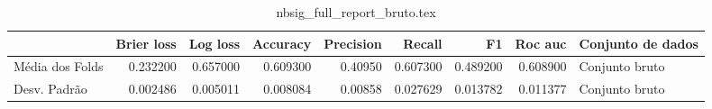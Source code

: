 \begin{table}
\centering
\caption{nbsig_full_report_bruto.tex}
\label{nbsig_full_report_bruto.tex}
\begin{tabular}{lrrrrrrrl}
\toprule
{} &  Brier  loss &  Log loss &  Accuracy  &  Precision  &   Recall  &       F1  &  Roc auc  & Conjunto de dados \\
\midrule
Média dos Folds &     0.232200 &  0.657000 &   0.609300 &     0.40950 &  0.607300 &  0.489200 &  0.608900 &    Conjunto bruto \\
Desv. Padrão    &     0.002486 &  0.005011 &   0.008084 &     0.00858 &  0.027629 &  0.013782 &  0.011377 &    Conjunto bruto \\
\bottomrule
\end{tabular}
\end{table}
